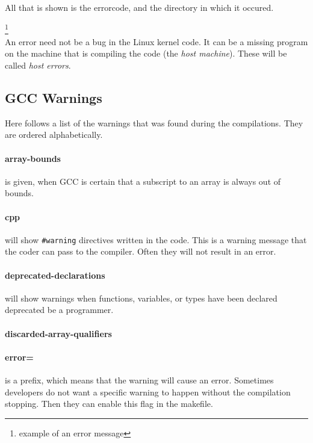 \documentclass[a4paper,11pt]{report}
\newcommand{\textcode}[1]{
    \fboxsep=1pt
    \texttt{\colorbox{gray!20}{#1}}
}
\newcommand{\figa}{
    \begin{figure}[!htpb]
    \centering
}
\newcommand{\figb}[2]{
    \caption{#1}
    \label{#2}
    \end{figure}
}
\begin{document}
All that is shown is the errorcode, and the directory in which it occured.

    \footnote{example of an error message}
\\

An error need not be a bug in the Linux kernel code. It can be a missing program
on the machine that is compiling the code (the \emph{host machine}). These will
be called \emph{host errors}.
\\




        \subsection{GCC Warnings}
Here follows a list of the warnings that was found during the compilations. 
They are ordered alphabetically.


            \paragraph{array-bounds}
is given, when GCC is certain that a subscript to an array is always out of 
bounds.




            \paragraph{cpp}
will show \textcode{\#warning} directives written in the code. This is a warning
message that the coder can pass to the compiler. Often they will not result in 
an error.


            \paragraph{deprecated-declarations}
will show warnings when functions, variables, or types have been declared 
deprecated be a programmer.


            \paragraph{discarded-array-qualifiers}
            \paragraph{error=}
is a prefix, which means that the warning will cause an error. Sometimes 
developers do not want a specific warning to happen without the compilation 
stopping. Then they can enable this flag in the makefile.
\end{document}
